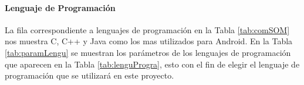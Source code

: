\paragraph{Lenguaje de Programación}

La fila correspondiente a lenguajes de programación en la Tabla \ref{tab:comSOM} nos muestra C, C++ y Java como los mas utilizados para Android. En la Tabla \ref{tab:paramLengu} se muestran los parámetros de los lenguajes de programación que aparecen en la Tabla \ref{tab:lenguProgra}, esto con el fin de elegir el lenguaje de programación que se utilizará en este proyecto. 


